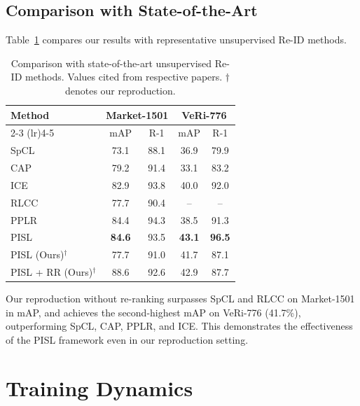 \subsection{Comparison with State-of-the-Art}

Table~\ref{tab:sota} compares our results with representative unsupervised Re-ID methods.

\begin{table}[H]
    \centering
    \caption{Comparison with state-of-the-art unsupervised Re-ID methods. Values cited from respective papers. $\dagger$ denotes our reproduction.}
    \label{tab:sota}
    \begin{tabular}{l c c c c}
        \toprule
        \multirow{2}{*}{\textbf{Method}} & \multicolumn{2}{c}{\textbf{Market-1501}} & \multicolumn{2}{c}{\textbf{VeRi-776}} \\
        \cmidrule(lr){2-3} \cmidrule(lr){4-5}
        & mAP & R-1 & mAP & R-1 \\
        \midrule
        SpCL \cite{ge2020selfpaced}       & 73.1 & 88.1 & 36.9 & 79.9 \\
        CAP \cite{wang2021cap}             & 79.2 & 91.4 & 33.1 & 83.2 \\
        ICE \cite{chen2021ice}             & 82.9 & 93.8 & 40.0 & 92.0 \\
        RLCC \cite{zhang2021rlcc}          & 77.7 & 90.4 & --   & --   \\
        PPLR \cite{cho2022pplr}            & 84.4 & 94.3 & 38.5 & 91.3 \\
        PISL \cite{tao2024unsupervised}    & \textbf{84.6} & 93.5 & \textbf{43.1} & \textbf{96.5} \\
        \midrule
        PISL (Ours)$^\dagger$              & 77.7 & 91.0 & 41.7 & 87.1 \\
        PISL + RR (Ours)$^\dagger$         & 88.6 & 92.6 & 42.9 & 87.7 \\
        \bottomrule
    \end{tabular}
\end{table}

Our reproduction without re-ranking surpasses SpCL and RLCC on Market-1501 in mAP, and achieves the second-highest mAP on VeRi-776 (41.7\%), outperforming SpCL, CAP, PPLR, and ICE. This demonstrates the effectiveness of the PISL framework even in our reproduction setting.

\section{Training Dynamics}

